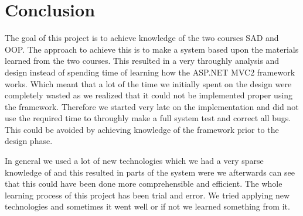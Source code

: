 \chapter{Conclusion}
\label{chap:conclusion}


The goal of this project is to achieve knowledge of the two courses SAD and OOP. The approach to achieve this is to make a system based upon the materials learned from the two courses. 
This resulted in a very throughly analysis and design instead of spending time of learning how the ASP.NET MVC2 framework works.
Which meant that a lot of the time we initially spent on the design were completely wasted as we realized that it could not be implemented proper using the framework. 
Therefore we started very late on the implementation and did not use the required time to throughly make a full system test and correct all bugs. 
This could be avoided by achieving knowledge of the framework prior to the design phase. 




In general we used a lot of new technologies which we had a very sparse knowledge of and this resulted in parts of the system were we afterwards can see that this could have been done more comprehensible and efficient. 
The whole learning process of this project has been trial and error. 
We tried applying new technologies and sometimes it went well or if not we learned something from it. 






